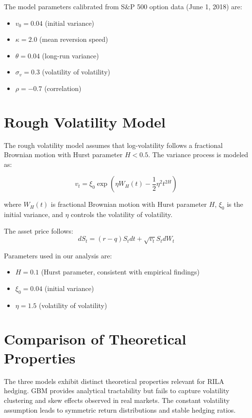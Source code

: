 \documentclass[12pt,a4paper]{report}
\begin{document}
The model parameters calibrated from S\&P 500 option data (June 1, 2018) are:
\begin{itemize}
\item $v_0 = 0.04$ (initial variance)
\item $\kappa = 2.0$ (mean reversion speed)
\item $\theta = 0.04$ (long-run variance)
\item $\sigma_v = 0.3$ (volatility of volatility)
\item $\rho = -0.7$ (correlation)
\end{itemize}

\section{Rough Volatility Model}

The rough volatility model assumes that log-volatility follows a fractional Brownian motion with Hurst parameter $H < 0.5$. The variance process is modeled as:

\begin{equation}
v_t = \xi_0 \exp\left(\eta W_H(t) - \frac{1}{2}\eta^2 t^{2H}\right)
\end{equation}

where $W_H(t)$ is fractional Brownian motion with Hurst parameter $H$, $\xi_0$ is the initial variance, and $\eta$ controls the volatility of volatility.

The asset price follows:
\begin{equation}
dS_t = (r - q)S_t dt + \sqrt{v_t}S_t dW_t
\end{equation}

Parameters used in our analysis are:
\begin{itemize}
\item $H = 0.1$ (Hurst parameter, consistent with empirical findings)
\item $\xi_0 = 0.04$ (initial variance)
\item $\eta = 1.5$ (volatility of volatility)
\end{itemize}

\section{Comparison of Theoretical Properties}

The three models exhibit distinct theoretical properties relevant for RILA hedging. GBM provides analytical tractability but fails to capture volatility clustering and skew effects observed in real markets. The constant volatility assumption leads to symmetric return distributions and stable hedging ratios.
\end{document}
